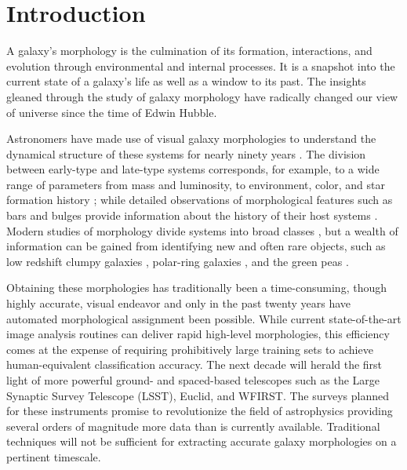 
\chapter{Introduction}
\label{chap:intro}


A galaxy's morphology is the culmination of its formation, interactions, and evolution through environmental and internal processes. It is a snapshot into the current state of a galaxy's life as well as a window to its past. The insights gleaned through the study of galaxy morphology have radically changed our view of universe since the time of Edwin Hubble. 


Astronomers have made use of visual galaxy morphologies to understand the dynamical structure of these systems for nearly ninety years 
\citep[e.g.,][]{Hubble1936, 
			deVaucouleurs1959,
			Sandage1961, 
			vandenBergh1976, 
			NairAbraham2010, 
			Baillard2011}. 
The division between early-type and late-type systems corresponds, for example, to a wide range of parameters from mass and luminosity, to environment, color, and star formation history 
\citep[e.g.,][]{Kormendy1977,  
			Dressler1980, 
			Strateva2001, 
			Blanton2003a, 
			Kauffman2003, 
			Nakamura2003, 
			Shen2003, 
			Peng2010}; 
while detailed observations of morphological features such as bars and bulges provide information about the history of their host systems 
\citep[e.g.,][]{KK04, 
			Elmegreen2008, 
			Sheth2008, 
			Masters2010, 
			Simmons2014}. 
Modern studies of morphology  divide systems into broad classes 
\citep[e.g.,][]{Conselice2006, 
			Lintott2008, 
			Kartaltepe2015, 
			Peth2016}, 
but a wealth of information can be gained from identifying new and often rare objects, such as low redshift clumpy galaxies \citep[e.g.,][]{Elmegreen2013}, polar-ring galaxies \citep[e.g.,][]{Whitmore1990}, and the green peas \citep{Cardamone2009}. 

Obtaining these morphologies has traditionally been a time-consuming, though highly accurate, visual endeavor and only in the past twenty years have automated morphological assignment been possible. While current state-of-the-art image analysis routines can deliver rapid high-level morphologies, this efficiency comes at the expense of requiring prohibitively large training sets to achieve human-equivalent classification accuracy.  The next decade will herald the first light of more powerful ground- and spaced-based telescopes such as the Large Synaptic Survey Telescope (LSST), Euclid, and WFIRST. The surveys planned for these instruments promise to revolutionize the field of astrophysics providing several orders of magnitude more data than is currently available. Traditional techniques will not be sufficient for extracting accurate galaxy morphologies on a pertinent timescale. 

